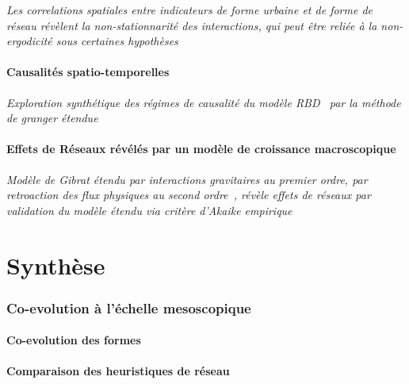 \textit{Les correlations spatiales entre indicateurs de forme urbaine et de forme de réseau révèlent la non-stationnarité des interactions, qui peut être reliée à la non-ergodicité sous certaines hypothèses~\cite{raimbault2016cautious}}


\subsection{Causalités spatio-temporelles}


\textit{Exploration synthétique des régimes de causalité du modèle RBD~\cite{raimbault2014hybrid} par la méthode de granger étendue} 


\subsection{Effets de Réseaux révélés par un modèle de croissance macroscopique}

\textit{Modèle de Gibrat étendu par interactions gravitaires au premier ordre, par retroaction des flux physiques au second ordre~\cite{raimbault2016models}, révèle effets de réseaux par validation du modèle étendu via critère d'Akaike empirique} 




\part{Synthèse}


\section{Co-evolution à l'échelle mesoscopique}

\subsection{Co-evolution des formes}


\subsection{Comparaison des heuristiques de réseau}


